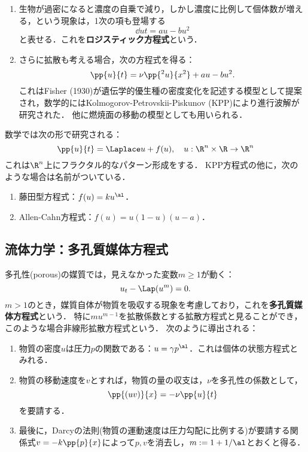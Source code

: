 \documentclass[uplatex,dvipdfmx]{jsreport}
\begin{document}
\begin{model}[反応と繁殖の拡散模型]\mbox{}
    \begin{enumerate}
        \item 生物が過密になると濃度の自乗で減り，しかし濃度に比例して個体数が増える，という現象は，1次の項も登場する
        \[\dd{u}{t}=au-bu^2\]
        と表せる．これを\textbf{ロジスティック方程式}という．
        \item さらに拡散も考える場合，次の方程式を得る：
        \[\pp{u}{t}=\nu\pp{^2u}{x^2}+au-bu^2.\]
        これはFisher (1930)が遺伝学的優生種の密度変化を記述する模型として提案され，数学的にはKolmogorov-Petrovskii-Piskunov (KPP)により進行波解が研究された．
        他に燃焼面の移動の模型としても用いられる．
    \end{enumerate}
\end{model}

\begin{example}
    数学では次の形で研究される：
    \[\pp{u}{t}=\Laplace u+f(u),\quad u:\R^n\times\R\to\R^n\]
    これは$\R^n$上にフラクタル的なパターン形成をする．
    KPP方程式の他に，次のような場合は名前がついている．
    \begin{enumerate}
        \item 藤田型方程式：$f(u)=ku^\al$．
        \item Allen-Cahn方程式：$f(u)=u(1-u)(u-a)$．
    \end{enumerate}
\end{example}

\subsection{流体力学：多孔質媒体方程式}

\begin{model}
    多孔性(porous)の媒質では，見えなかった変数$m\ge 1$が動く：
    \[u_t-\Lap(u^m)=0.\]
    $m>1$のとき，媒質自体が物質を吸収する現象を考慮しており，これを\textbf{多孔質媒体方程式}という．
    特に$mu^{m-1}$を拡散係数とする拡散方程式と見ることができ，このような場合非線形拡散方程式という．
    次のように導出される：
    \begin{enumerate}
        \item 物質の密度$u$は圧力$p$の関数である：$u=\gamma p^\al$．これは個体の状態方程式とみれる．
        \item 物質の移動速度を$v$とすれば，物質の量の収支は，$\nu$を多孔性の係数として，
        \[\pp{(uv)}{x}=-\nu\pp{u}{t}\]
        を要請する．
        \item 最後に，Darcyの法則(物質の運動速度は圧力勾配に比例する)が要請する関係式$v=-k\pp{p}{x}$によって$p,v$を消去し，$m:=1+1/\al$とおくと得る．
    \end{enumerate}
\end{model}
\end{document}

